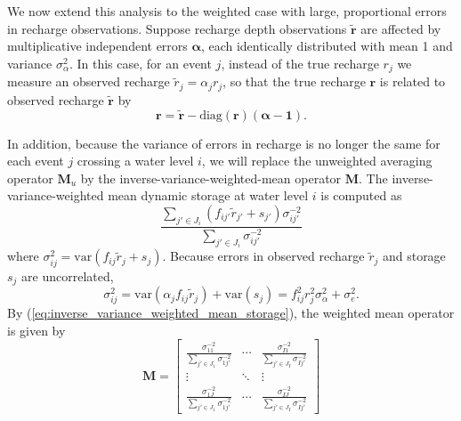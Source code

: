 \documentclass[11pt,a4paper]{article}
\renewcommand{\vec}[1]{\mathbf{#1}}
\begin{document}
We now extend this analysis to the weighted case with large,
proportional errors in recharge observations.  Suppose recharge depth
observations $\tilde{\vec{r}}$ are affected by multiplicative
independent errors $\bm{\alpha}$, each identically distributed with
mean 1 and variance $\sigma_\alpha^2$.  In this case, for an event
$j$, instead of the true recharge $r_j$ we measure an observed
recharge $\tilde{r}_j = \alpha_j r_j$, so that the true recharge
$\vec{r}$ is related to observed recharge $\tilde{\vec{r}}$ by
\begin{equation}
  \label{eq:recharge_with_error}
  \vec{r} = \tilde{\vec{r}} - \text{diag}(\vec{r})\left(\bm\alpha - \vec{1}\right).
\end{equation}

In addition, because the variance of errors in recharge is no longer
the same for each event $j$ crossing a water level $i$, we will
replace the unweighted averaging operator $\vec{M}_u$ by the
inverse-variance-weighted-mean operator $\vec{M}$.  The
inverse-variance-weighted mean dynamic storage at water level $i$ is
computed as
\begin{equation}
  \label{eq:inverse_variance_weighted_mean_storage}
  \frac{\sum_{j'\in J_i} (f_{ij'} \tilde{r}_{j'} + s_{j'}) \sigma^{-2}_{ij'}}
       {\sum_{j'\in J_i} \sigma^{-2}_{ij'}}
\end{equation}
where $\sigma^2_{ij} = \text{var}(f_{ij} \tilde{r}_j + s_j)$. Because
errors in observed recharge $\tilde{r}_j$ and storage $s_j$ are
uncorrelated,
\begin{equation}
  \sigma^2_{ij} = \text{var}(\alpha_j f_{ij} \tilde{r}_j) + \text{var}(s_j) = f_{ij}^2 r_j^2\sigma_\alpha^2 + \sigma_e^2.
\end{equation}
By (\ref{eq:inverse_variance_weighted_mean_storage}), the weighted
mean operator is given by
\begin{equation}
  \label{eq:weighted_mean_operator}
  \vec{M} = \left[
    \begin{array}{ccc}
      \frac{\sigma^{-2}_{11}}{\sum_{j'\in J_1}\sigma^{-2}_{1j'}} & \cdots & \frac{\sigma^{-2}_{I1}}{\sum_{j'\in J_I}\sigma^{-2}_{Ij'}} \\
      \vdots & \ddots & \vdots \\
      \frac{\sigma^{-2}_{1J}}{\sum_{j'\in J_1}\sigma^{-2}_{1j'}} & \cdots & \frac{\sigma^{-2}_{IJ}}{\sum_{j'\in J_I}\sigma^{-2}_{Ij'}}
    \end{array}
  \right]
\end{equation}
\end{document}
